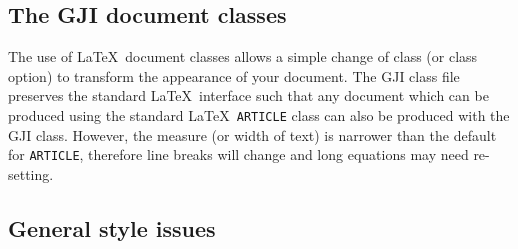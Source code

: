 \documentclass{gji}
\begin{document}


\subsection{The GJI document classes}

The use of \LaTeX\ document classes allows a simple change of class
(or class option) to transform the appearance of your document. The
GJI class file preserves the standard \LaTeX\ interface such that any
document which can be produced using the standard \LaTeX\ \verb"ARTICLE"
class can also be produced with the GJI class. However, the measure (or
width of text) is narrower than the default for \verb"ARTICLE", therefore
line breaks will change and long equations may need re-setting.


\subsection{General style issues}
\end{document}
